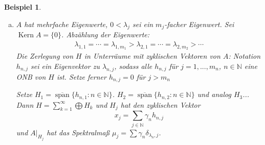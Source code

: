 \documentclass[12pt]{extreport} %
\newtheorem{Beispiel}[Satz]{Beispiel}
\DeclareMathOperator{\Kern}{Kern}
\DeclareMathOperator{\spann}{span}
\numberwithin{equation}{section}
\newcommand{\R}{\mathbb{R}} %
\newcommand{\N}{\mathbb{N}} %
\newcommand{\Bew}{\emph{Beweis: }}
\begin{document}
\begin{Beispiel}
\begin{enumerate}[a)]
			\Bew Sei $y= \sum_{j = 1}^{m}\beta_j h_j\in H$. Zu zeigen: Es gibt $\alpha_0,...,\alpha_{m-1}$ mit $y = \sum_{j = 0}^{m-1}\alpha_j A^j x_0$. 
			\begin{align*}
				\sum_{j = 0}^{m}\beta_j h_j = y &= \sum_{j = 0}^{m-1}\alpha_j A^j x_0\\
				&=\sum_{j = 1}^{m-1}\alpha_j \left(\sum_{n=1}^{\infty} \gamma_n A^jh_n \right)\\
				&= \sum_{n = 1}^{\infty}\left(\sum_{j = 0}^{m-1} \gamma_n \lambda_n^j \alpha_j \right)h_n
			\end{align*}
			$\Rightarrow$ $\beta_n = \sum_{j = 0}^{m-1}(\gamma_n \lambda_n^j)\alpha_j$, $n = 1,...,m$. Zu zeigen: Zu $\beta_1,...,\beta_m$ gibt es $\alpha_0,...,\alpha_{m-1}$ mit $0\neq \det(\gamma_n\lambda_n^j)_{n,j} = \left(\prod_{n = 1}^{m} \gamma_n^m \right)\det(\lambda_n^j) = \gamma \neq 0$.
			Spektralmaß von $A$:
			\begin{align*}
				\int f(t)d\mu_{x_0}(t) &= \langle f(A)x_0,x_0\rangle,~ x_0 = \sum\gamma_n h_n\\
				&= \left(\sum \gamma_n^2 \delta_{\lambda_n} \right)f
			\end{align*}
			Also 
			$$\boxed{\mu_{x_0} = \sum_{n = 1}^{\infty}\gamma_n^2 \delta_{\lambda_n}}, \|\mu_{x_0}\|^2 = \sum \gamma_n^2 = 1.$$
			d.h. formal sieht die Spektraldarstellung so aus:
			$$L^2(\R,\mu_x) = L^2(\R,\sum \gamma_n \delta_{\lambda_n} = l^2(\N,\gamma_n^2),$$
			d.h. $\|(\alpha_n)\|_{l^2(\N,\gamma_n^2)} = \left(\sum_{n = 1}^{\infty}|\alpha_n|^2\gamma_n^2 \right)^{1/2}$. $U:L^2(\R,\mu_x)\rightarrow H$. Polynom $p\rightarrow p(A)x_0$, $M g(t) = tg(t)$, $t\in\{\lambda_n:\nLeftarrow\in \N \}$, $Mg(\lambda_n) = \lambda_n g(\lambda_n)$.
			\item $A$ hat mehrfache Eigenwerte, $0<\lambda_j$ sei ein $m_j$-facher Eigenwert. Sei $\Kern A = \{0\}$. Abzählung der Eigenwerte:
			\begin{align*}
				\lambda_{1,1} = \cdots = \lambda_{1,m_1}>\lambda_{2,1} = \cdots = \lambda_{2,m_2}>\cdots
			\end{align*}
			Die Zerlegung von $H$ in Unterräume mit zyklischen Vektoren von $A$: Notation $h_{n,j}$ sei ein Eigenvektor zu $\lambda_{n,j}$, sodass alle $h_{n,j}$ für $j = 1,...,m_n$, $n \in \N$ eine ONB von $H$ ist. Setze ferner $h_{n,j} = 0$ für $j>m_n$
			
			Setze $H_1=\overline{\spann}\{h_{n,1}:n\in \N \}$. $H_2 = \overline{\spann}\{h_{n,2}: n\in \N \}$ und analog $H_3$... Dann $H = \sum_{k = 1}^{\infty} \bigoplus H_k$ und $H_j$ hat den zyklischen Vektor 
			$$x_j = \sum_{j\in \N} \gamma_n h_{n,j}$$
			und $A|_{H_j}$ hat das Spektralmaß $\mu_j = \sum \gamma_n\delta_{\lambda_n, j}$.
		\end{enumerate}
	\end{Beispiel}
\end{document}
